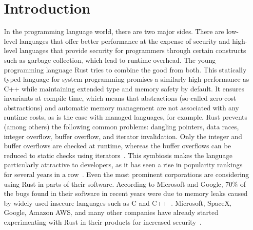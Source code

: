 \documentclass[paper=a4,%
  twoside,%
  BCOR4mm,%
  abstract=true,%
  toc=bibliography,%
  chapterprefix=true,%
  toc=bibliographynumbered,%
  open=right,%
  english,%
  pagesize=pdftex]{scrreprt}
\begin{document}
\chapter{Introduction}
\label{chap:introduction}
In the programming language world, there are two major sides. There are low-level languages that offer better performance at the expense of security and high-level languages that provide security for programmers through certain constructs such as garbage collection, which lead to runtime overhead. The young programming language Rust tries to combine the good from both. This statically typed language for system programming promises a similarly high performance as C++ while maintaining extended type and memory safety by default. It ensures invariants at compile time, which means that abstractions (so-called zero-cost abstractions) and automatic memory management are not associated with any runtime costs, as is the case with managed languages, for example. Rust prevents (among others) the following common problems: dangling pointers, data races, integer overflow, buffer overflow, and iterator invalidation. Only the integer and buffer overflows are checked at runtime, whereas the buffer overflows can be reduced to static checks using iterators~\cite{Anderson2016}. This symbiosis makes the language particularly attractive to developers, as it has seen a rise in popularity rankings for several years in a row~\cite{StackOverflow2020}. Even the most prominent corporations are considering using Rust in parts of their software. According to Microsoft and Google, 70\% of the bugs found in their software in recent years were due to memory leaks caused by widely used insecure languages such as C and C++~\cite{Microsoft2019MemoryBugs, RustInAndroid}. Microsoft, SpaceX, Google, Amazon AWS, and many other companies have already started experimenting with Rust in their products for increased security~\cite{MicrosoftJoinsRust, AmazonLovesRust, RustInAndroid, GoogleRustFoundation}.
\end{document}
